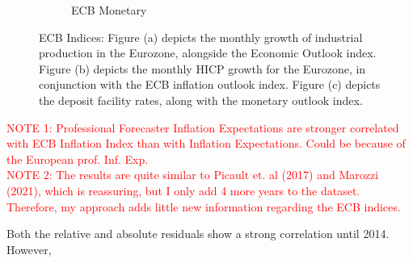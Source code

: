 \documentclass[review]{elsarticle}
\begin{document}
\begin{figure}[h!]
\begin{subfigure}{6cm}
    \caption{ECB Monetary}
    \label{ECB_inf}
\end{subfigure}
\caption{ECB Indices: Figure (a) depicts the monthly growth of industrial production in the Eurozone, alongside the Economic Outlook index. Figure (b) depicts the monthly HICP growth for the Eurozone, in conjunction with the ECB inflation outlook index. Figure (c) depicts the deposit facility rates, along with the monetary outlook index.}
\label{fig:ECB Index}
    \end{figure}
\newpage
\textcolor{red}{NOTE 1: Professional Forecaster Inflation Expectations are stronger correlated with ECB Inflation Index than with Inflation Expectations. Could be because of the European prof. Inf. Exp.}
\\
\textcolor{red}{NOTE 2: The results are quite similar to Picault et. al (2017) and Marozzi (2021), which is reassuring, but I only add 4 more years to the dataset. Therefore, my approach adds little new information regarding the ECB indices.}

Both the relative and absolute residuals show a strong correlation until 2014. However,  



\newpage
\end{document}

